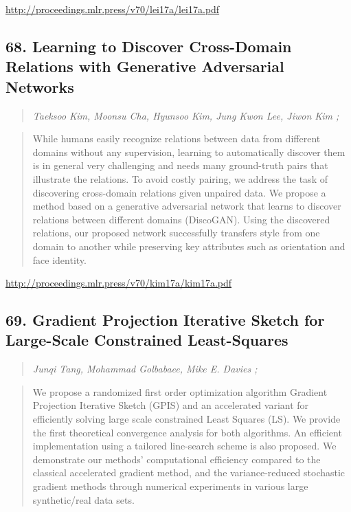 \documentclass{article}
\begin{document}
\href{http://proceedings.mlr.press/v70/lei17a/lei17a.pdf}{http://proceedings.mlr.press/v70/lei17a/lei17a.pdf}

\subsection{68. Learning to Discover Cross-Domain Relations with Generative Adversarial Networks}

\begin{quote}
\footnotesize{\textit{Taeksoo Kim, Moonsu Cha, Hyunsoo Kim, Jung Kwon Lee, Jiwon Kim ;}}

\end{quote}

\begin{quote}
    While humans easily recognize relations between data from different domains without any supervision, learning to automatically discover them is in general very challenging and needs many ground-truth pairs that illustrate the relations. To avoid costly pairing, we address the task of discovering cross-domain relations given unpaired data. We propose a method based on a generative adversarial network that learns to discover relations between different domains (DiscoGAN). Using the discovered relations, our proposed network successfully transfers style from one domain to another while preserving key attributes such as orientation and face identity.  
\end{quote}

\href{http://proceedings.mlr.press/v70/kim17a/kim17a.pdf}{http://proceedings.mlr.press/v70/kim17a/kim17a.pdf}

\subsection{69. Gradient Projection Iterative Sketch for Large-Scale Constrained Least-Squares}

\begin{quote}
\footnotesize{\textit{Junqi Tang, Mohammad Golbabaee, Mike E. Davies ;}}

\end{quote}

\begin{quote}
    We propose a randomized first order optimization algorithm Gradient Projection Iterative Sketch (GPIS) and an accelerated variant for efficiently solving large scale constrained Least Squares (LS). We provide the first theoretical convergence analysis for both algorithms. An efficient implementation using a tailored line-search scheme is also proposed. We demonstrate our methods’ computational efficiency compared to the classical accelerated gradient method, and the variance-reduced stochastic gradient methods through numerical experiments in various large synthetic/real data sets.  
\end{quote}
\end{document}
